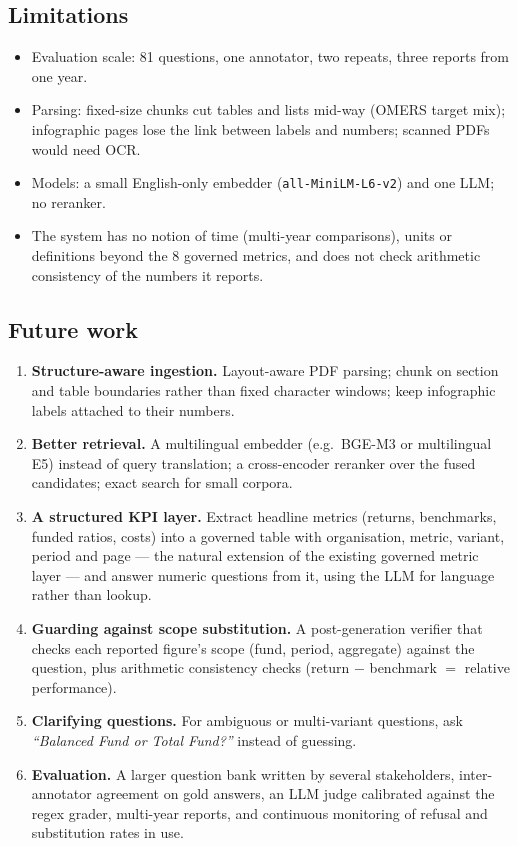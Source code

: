 \documentclass[11pt,a4paper]{article}
\begin{document}
\subsection{Limitations}
\begin{itemize}
  \item Evaluation scale: 81 questions, one annotator, two repeats, three reports from one year.
  \item Parsing: fixed-size chunks cut tables and lists mid-way (OMERS target mix); infographic pages lose the link
        between labels and numbers; scanned PDFs would need OCR.
  \item Models: a small English-only embedder (\texttt{all-MiniLM-L6-v2}) and one LLM; no reranker.
  \item The system has no notion of time (multi-year comparisons), units or definitions beyond the 8 governed metrics,
        and does not check arithmetic consistency of the numbers it reports.
\end{itemize}

\subsection{Future work}
\begin{enumerate}
  \item \textbf{Structure-aware ingestion.} Layout-aware PDF parsing; chunk on section and table boundaries rather than
        fixed character windows; keep infographic labels attached to their numbers.
  \item \textbf{Better retrieval.} A multilingual embedder (e.g.\ BGE-M3 or multilingual E5) instead of query
        translation; a cross-encoder reranker over the fused candidates; exact search for small corpora.
  \item \textbf{A structured KPI layer.} Extract headline metrics (returns, benchmarks, funded ratios, costs) into a
        governed table with organisation, metric, variant, period and page --- the natural extension of the existing
        governed metric layer --- and answer numeric questions from it, using the LLM for language rather than lookup.
  \item \textbf{Guarding against scope substitution.} A post-generation verifier that checks each reported figure's
        scope (fund, period, aggregate) against the question, plus arithmetic consistency checks
        (return $-$ benchmark $=$ relative performance).
  \item \textbf{Clarifying questions.} For ambiguous or multi-variant questions, ask \emph{``Balanced Fund or Total
        Fund?''} instead of guessing.
  \item \textbf{Evaluation.} A larger question bank written by several stakeholders, inter-annotator agreement on gold
        answers, an LLM judge calibrated against the regex grader, multi-year reports, and continuous monitoring of
        refusal and substitution rates in use.
\end{enumerate}
\end{document}
